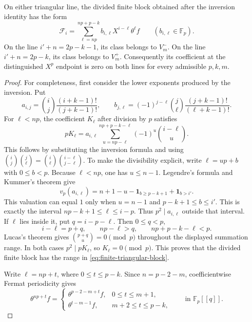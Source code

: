\begin{lemma}
\label{lem:finite-block-no-endpoint}
On either triangular line, the divided finite block obtained after the
inversion identity has the form
\begin{equation}
\label{eq:finite-triangular-block}
 \mathcal F_i=\sum_{\ell=np}^{np+p-k}
 b_{i,\ell}X^{i-\ell}\theta^\ell f
 \qquad (b_{i,\ell}\in\mathbb F_p).
\end{equation}
On the line $i'+n=2p-k-1$, its class belongs to $V_m^-$.  On the line
$i'+n=2p-k$, its class belongs to $V_m^+$.  Consequently its coefficient
at the distinguished $X^p$ endpoint is zero on both lines for every
admissible $p,k,m$.
\end{lemma}

\begin{proof}
For completeness, first consider the lower exponents produced by the
inversion.  Put
\[
 a_{i,j}=\binom ij\frac{(i+k-1)!}{(j+k-1)!},
 \qquad
 b_{j,\ell}=(-1)^{j-\ell}\binom j\ell
             \frac{(j+k-1)!}{(\ell+k-1)!}.
\]
For $\ell<np$, the coefficient $K_\ell$ after division by $p$ satisfies
\[
 pK_\ell
 =a_{i,\ell}
   \sum_{u=np-\ell}^{np+p-k-\ell}
      (-1)^u\binom{i-\ell}{u}.
\]
This follows by substituting the inversion formula and using
$\binom ij\binom j\ell=\binom i\ell\binom{i-\ell}{j-\ell}$.
To make the divisibility explicit, write $\ell=up+b$ with
$0\leq b<p$.  Because $\ell<np$, one has $u\leq n-1$.  Legendre's
formula and Kummer's theorem give
\[
 v_p(a_{i,\ell})
 =n+1-u-\boldsymbol 1_{b\geq p-k+1}
   +\boldsymbol 1_{b>i'}.
\]
This valuation can equal $1$ only when
$u=n-1$ and $p-k+1\leq b\leq i'$.  This is exactly the interval
$np-k+1\leq\ell\leq i-p$.  Thus $p^2\mid a_{i,\ell}$ outside that
interval.  If $\ell$ lies inside it, put
$q=i-p-\ell$.  Then $0\leq q<p$,
\[
 i-\ell=p+q,\qquad
 np-\ell>q,\qquad np+p-k-\ell<p.
\]
Lucas's theorem gives $\binom{p+q}{u}=0\pmod p$ throughout the displayed
summation range.  In both cases $p^2\mid pK_\ell$, so
$K_\ell=0\pmod p$.  This proves that the divided finite block has the
range in \eqref{eq:finite-triangular-block}.

Write $\ell=np+t$, where $0\leq t\leq p-k$.  Since
$n=p-2-m$, coefficientwise Fermat periodicity gives
\[
 \theta^{np+t}f=
 \begin{cases}
  \theta^{p-2-m+t}f,&0\leq t\leq m+1,\\
  \theta^{t-m-1}f,&m+2\leq t\leq p-k,
 \end{cases}
 \qquad\text{in }\mathbb F_p[[q]].
\]


\end{proof}
